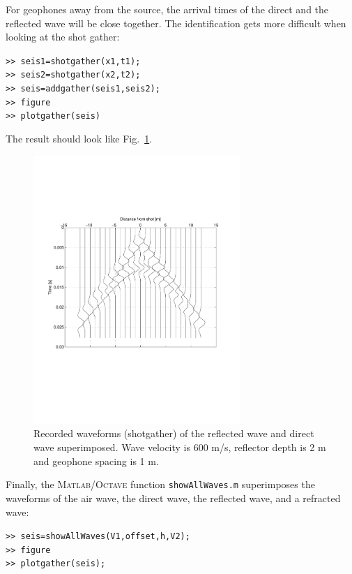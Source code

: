 \documentclass[11pt]{article}
\begin{document}
For geophones away from the source, the arrival times of the direct
and the reflected wave will be close together. The identification gets
more difficult when looking at the shot gather:

\verb#>> seis1=shotgather(x1,t1);#\\
\verb#>> seis2=shotgather(x2,t2);#\\
\verb#>> seis=addgather(seis1,seis2);#\\
\verb#>> figure#\\
\verb#>> plotgather(seis)#

The result should look like Fig.~\ref{directreflect}.

\begin{figure}
  \centering
  \includegraphics[width=0.7\textwidth, trim = 1cm 7.5cm 2cm
    6cm,clip]{figures/DirectReflected.pdf}
    \caption{\label{directreflect} Recorded waveforms (shotgather) of
      the reflected wave and direct wave superimposed. Wave
      velocity is 600 m/s, reflector depth is 2 m and geophone spacing
      is 1 m.}
\end{figure}

Finally, the \textsc{Matlab}/\textsc{Octave} function \verb#showAllWaves.m#
superimposes the waveforms of the air wave, the direct wave, the
reflected wave, and a refracted wave:

\verb#>> seis=showAllWaves(V1,offset,h,V2);#\\
\verb#>> figure#\\
\verb#>> plotgather(seis);#
\end{document}
